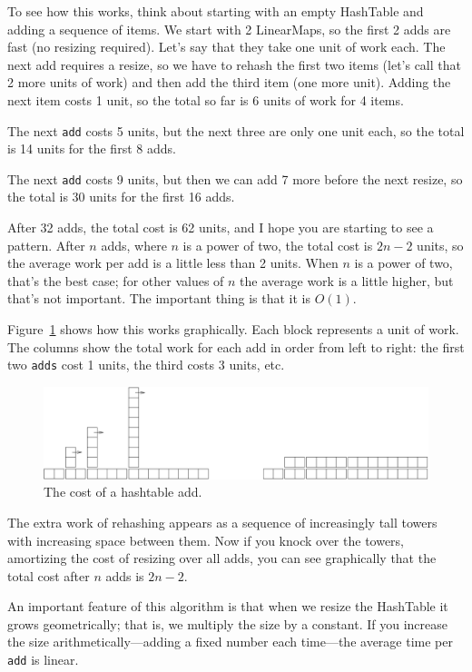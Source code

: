 \documentclass[10pt]{book}
\begin{document}
To see how this works, think about starting with an empty
HashTable and adding a sequence of items.  We start with 2 LinearMaps,
so the first 2 adds are fast (no resizing required).  Let's
say that they take one unit of work each.  The next add
requires a resize, so we have to rehash the first two
items (let's call that 2 more units of work) and then
add the third item (one more unit).  Adding the next item
costs 1 unit, so the total so far is
6 units of work for 4 items.

The next {\tt add} costs 5 units, but the next three
are only one unit each, so the total is 14 units for the
first 8 adds.

The next {\tt add} costs 9 units, but then we can add 7 more
before the next resize, so the total is 30 units for the
first 16 adds.

After 32 adds, the total cost is 62 units, and I hope you are starting
to see a pattern.  After $n$ adds, where $n$ is a power of two, the
total cost is $2n-2$ units, so the average work per add is
a little less than 2 units.  When $n$ is a power of two, that's
the best case; for other values of $n$ the average work is a little
higher, but that's not important.  The important thing is that it
is $O(1)$.

Figure~\ref{fig.hash} shows how this works graphically.  Each
block represents a unit of work.  The columns show the total
work for each add in order from left to right: the first two
{\tt adds} cost 1 units, the third costs 3 units, etc.

\begin{figure}
\centerline{\includegraphics[scale=1.0]{figs/towers.pdf}}
\caption{The cost of a hashtable add.\label{fig.hash}}
\end{figure}

The extra work of rehashing appears as a sequence of increasingly
tall towers with increasing space between them.  Now if you knock
over the towers, amortizing the cost of resizing over all
adds, you can see graphically that the total cost after $n$
adds is $2n - 2$.

An important feature of this algorithm is that when we resize the
HashTable it grows geometrically; that is, we multiply the size by a
constant.  If you increase the size
arithmetically---adding a fixed number each time---the average time
per {\tt add} is linear.
\end{document}
